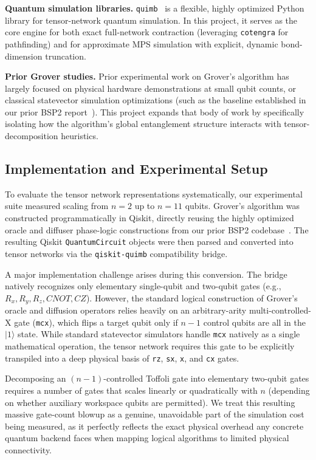 \documentclass[sigconf, authorversion, nonacm]{acmart}
\begin{document}
\textbf{Quantum simulation libraries.} \texttt{quimb}~\cite{quimb} is a flexible, highly optimized Python library for tensor-network quantum simulation. In this project, it serves as the core engine for both exact full-network contraction (leveraging \texttt{cotengra} for pathfinding) and for approximate MPS simulation with explicit, dynamic bond-dimension truncation.

\textbf{Prior Grover studies.} Prior experimental work on Grover's algorithm has largely focused on physical hardware demonstrations at small qubit counts, or classical statevector simulation optimizations (such as the baseline established in our prior BSP2 report~\cite{BSP2Report}). This project expands that body of work by specifically isolating how the algorithm's global entanglement structure interacts with tensor-decomposition heuristics.

\subsection{Implementation and Experimental Setup}

To evaluate the tensor network representations systematically, our experimental suite measured scaling from $n=2$ up to $n=11$ qubits. Grover's algorithm was constructed programmatically in Qiskit, directly reusing the highly optimized oracle and diffuser phase-logic constructions from our prior BSP2 codebase~\cite{BSP2Report}. The resulting Qiskit \texttt{QuantumCircuit} objects were then parsed and converted into tensor networks via the \texttt{qiskit-quimb} compatibility bridge.

A major implementation challenge arises during this conversion. The bridge natively recognizes only elementary single-qubit and two-qubit gates (e.g., $R_x, R_y, R_z, CNOT, CZ$). However, the standard logical construction of Grover's oracle and diffusion operators relies heavily on an arbitrary-arity multi-controlled-X gate (\texttt{mcx}), which flips a target qubit only if $n-1$ control qubits are all in the $|1\rangle$ state. While standard statevector simulators handle \texttt{mcx} natively as a single mathematical operation, the tensor network requires this gate to be explicitly transpiled into a deep physical basis of \texttt{rz}, \texttt{sx}, \texttt{x}, and \texttt{cx} gates.

Decomposing an $(n-1)$-controlled Toffoli gate into elementary two-qubit gates requires a number of gates that scales linearly or quadratically with $n$ (depending on whether auxiliary workspace qubits are permitted). We treat this resulting massive gate-count blowup as a genuine, unavoidable part of the simulation cost being measured, as it perfectly reflects the exact physical overhead any concrete quantum backend faces when mapping logical algorithms to limited physical connectivity.
\end{document}
